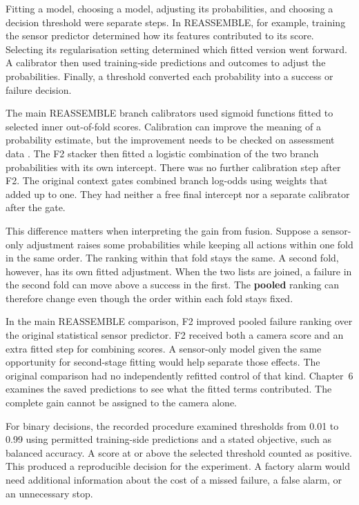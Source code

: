 Fitting a model, choosing a model, adjusting its probabilities, and choosing a decision threshold were separate steps. In REASSEMBLE, for example, training the sensor predictor determined how its features contributed to its score. Selecting its regularisation setting determined which fitted version went forward. A calibrator then used training-side predictions and outcomes to adjust the probabilities. Finally, a threshold converted each probability into a success or failure decision.

The main REASSEMBLE branch calibrators used sigmoid functions fitted to selected inner out-of-fold scores. Calibration can improve the meaning of a probability estimate, but the improvement needs to be checked on assessment data \parencite{Guo2017Calibration}. The F2 stacker then fitted a logistic combination of the two branch probabilities with its own intercept. There was no further calibration step after F2. The original context gates combined branch log-odds using weights that added up to one. They had neither a free final intercept nor a separate calibrator after the gate.

This difference matters when interpreting the gain from fusion. Suppose a sensor-only adjustment raises some probabilities while keeping all actions within one fold in the same order. The ranking within that fold stays the same. A second fold, however, has its own fitted adjustment. When the two lists are joined, a failure in the second fold can move above a success in the first. The \textbf{pooled} ranking can therefore change even though the order within each fold stays fixed.

In the main REASSEMBLE comparison, F2 improved pooled failure ranking over the original statistical sensor predictor. F2 received both a camera score and an extra fitted step for combining scores. A sensor-only model given the same opportunity for second-stage fitting would help separate those effects. The original comparison had no independently refitted control of that kind. Chapter~6 examines the saved predictions to see what the fitted terms contributed. The complete gain cannot be assigned to the camera alone.

For binary decisions, the recorded procedure examined thresholds from 0.01 to 0.99 using permitted training-side predictions and a stated objective, such as balanced accuracy. A score at or above the selected threshold counted as positive. This produced a reproducible decision for the experiment. A factory alarm would need additional information about the cost of a missed failure, a false alarm, or an unnecessary stop.

